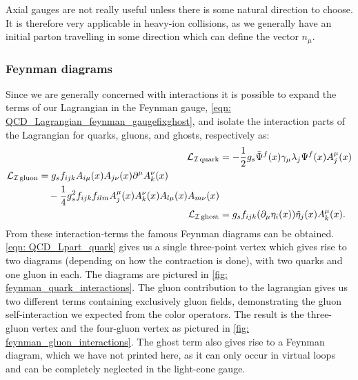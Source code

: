 \documentclass[main.tex]{subfiles}
\begin{document}
Axial gauges are not really useful unless there is some natural direction to choose. It is therefore very applicable in heavy-ion collisions, as we generally have an initial parton travelling in some direction which can define the vector \(n_\mu\). 

\subsubsection*{Feynman diagrams}
Since we are generally concerned with interactions it is possible to expand the terms of our Lagrangian in the Feynman gauge, \autoref{eqn: QCD_Lagrangian_feynman_gaugefixghost}, and isolate the interaction parts of the Lagrangian for quarks, gluons, and ghosts, respectively as:
\begin{align}
    \mathcal{L}_{\mathcal{I}\,\text{quark}} &= - \frac{1}{2} g_s \bar \Psi^f(x) \gamma_\mu \lambda_j \Psi^f(x) A_j^\mu (x) \label{eqn: QCD_Lpart_quark}  \\
    \begin{split}
    \mathcal{L}_{\mathcal{I}\,\text{gluon}} &= g_s f_{ijk} A_{i\mu}(x)A_{j\nu}(x) \partial^\mu A_k^\nu(x) \\
    &\quad - \frac{1}{4} g_s^2 f_{ijk} f_{ilm} A_j^\mu(x) A_k^\nu(x) A_{l\mu}(x) A_{m\nu}(x) \label{eqn: QCD_Lpart_gluon} \end{split} \\
    \mathcal{L}_{\mathcal{I}\,\text{ghost}} &= g_s f_{ijk} (\partial_\mu \eta_i(x)) \Tilde{\eta}_j(x) A_k^\mu(x). \label{eqn: QCD_Lpart_ghost} 
\end{align}
From these interaction-terms the famous Feynman diagrams can be obtained. \autoref{eqn: QCD_Lpart_quark} gives us a single three-point vertex which gives rise to two diagrams (depending on how the contraction is done), with two quarks and one gluon in each. The diagrams are pictured in \autoref{fig: feynman_quark_interactions}. The gluon contribution to the lagrangian gives us two different terms containing exclusively gluon fields, demonstrating the gluon self-interaction we expected from the color operators. The result is the three-gluon vertex and the four-gluon vertex as pictured in \autoref{fig: feynman_gluon_interactions}. The ghost term also gives rise to a Feynman diagram, which we have not printed here, as it can only occur in virtual loops and can be completely neglected in the light-cone gauge.
\end{document}
